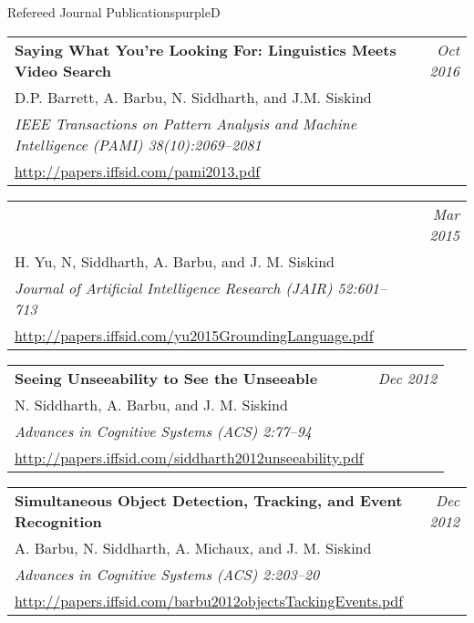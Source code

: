 \documentclass[a4paper]{article}
\makeatletter
\newlength{\itemtextwidth}
\newenvironment{publication}[5]
{ \item
  \begin{tabular*}{\itemtextwidth}{@{}p{5.6in}@{\extracolsep{\fill}}r@{}}
    \textbf{#1} & \textit{#2}\\ #3 &\\ \textit{#4}&\\ #5
  \end{tabular*}
  \vspace*{-2pt}
} {}
\def\item{\addtocounter{enumi}{-2}\oldItem}
\makeatother
\begin{document}
\begin{region}[J][4]{Refereed Journal Publications}{purpleD}
  \begin{publication} {Saying What You're Looking For: Linguistics Meets Video Search}
    {Oct 2016}
    {D.P. Barrett, A. Barbu, N. Siddharth, and J.M. Siskind}
    {IEEE Transactions on Pattern Analysis and Machine Intelligence (PAMI)
      \hfill \emph{38(10):2069--2081}}
    {\url{http://papers.iffsid.com/pami2013.pdf}\label{j:4}}
  \end{publication}
  \begin{publication} {A Compositional Framework for Grounding Language Inference, Generation,
      and\rule{6ex}{0pt} Acquisition in Video}
    {Mar 2015}
    {H. Yu, N, Siddharth, A. Barbu, and J. M. Siskind}
    {Journal of Artificial Intelligence Research (JAIR) \hfill \emph{52:601--713}}
    {\url{http://papers.iffsid.com/yu2015GroundingLanguage.pdf}\label{j:3}}
  \end{publication}
  \begin{publication} {Seeing Unseeability to See the Unseeable}
    {Dec 2012}
    {N. Siddharth, A. Barbu, and J. M. Siskind}
    {Advances in Cognitive Systems (ACS) \hfill \emph{2:77--94}}
    {\url{http://papers.iffsid.com/siddharth2012unseeability.pdf}\label{j:2}}
  \end{publication}
  \begin{publication} {Simultaneous Object Detection, Tracking, and Event Recognition}
    {Dec 2012}
    {A. Barbu, N. Siddharth, A. Michaux, and J. M. Siskind}
    {Advances in Cognitive Systems (ACS) \hfill \emph{2:203--20}}
    {\url{http://papers.iffsid.com/barbu2012objectsTackingEvents.pdf}\label{j:1}}
  \end{publication}
\end{region}
\end{document}

